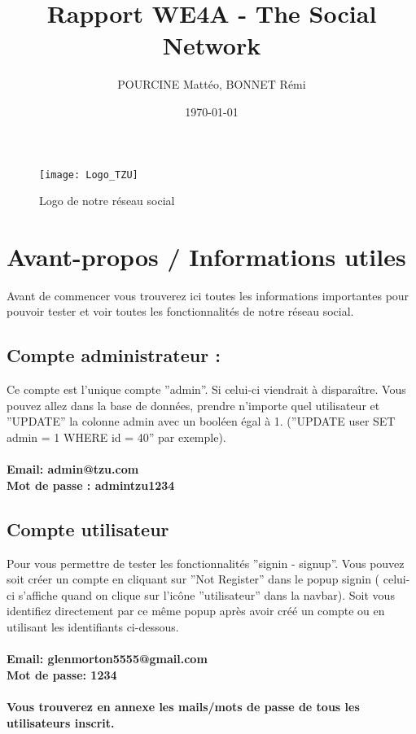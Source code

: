 \documentclass{article}
\title{Rapport WE4A - The Social Network}
\author{POURCINE Mattéo, BONNET Rémi}
\date{\today}
\begin{document}
\maketitle

\begin{figure}[h]\centering
\texttt{[image: Logo\_TZU]}
\caption{Logo de notre réseau social}
\end{figure}

\newpage
\tableofcontents
\newpage
\section{Avant-propos / Informations utiles}
Avant de commencer vous trouverez ici toutes les informations importantes pour pouvoir tester et
voir toutes les fonctionnalités de notre réseau social.
\subsection{Compte administrateur :}
Ce compte est l’unique compte ”admin”. Si celui-ci viendrait à disparaître. Vous pouvez allez dans
la base de données, prendre n’importe quel utilisateur et ”UPDATE” la colonne admin avec un
booléen  égal à 1. (”UPDATE user SET admin = 1 WHERE id = 40” par exemple).\\\\
\textbf{Email: admin@tzu.com}\\
\textbf{Mot de passe : admintzu1234}
\subsection{Compte utilisateur}
Pour vous permettre de tester les fonctionnalités  ”signin - signup”. Vous pouvez soit créer un compte
en cliquant sur ”Not Register” dans le popup signin ( celui-ci s’affiche quand on clique sur l’icône
”utilisateur” dans la navbar). Soit vous identifiez directement par ce même popup après avoir créé
un compte ou en utilisant les identifiants ci-dessous.\\\\
\textbf{Email: glenmorton5555@gmail.com}\\
\textbf{Mot de passe: 1234}\\\\
\textbf{Vous trouverez en annexe les mails/mots de passe de tous les utilisateurs inscrit.}
\end{document}
